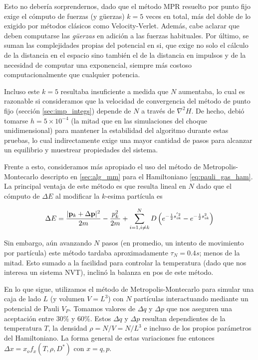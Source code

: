 Esto no debería sorprendernos, dado que el método MPR resuelto por punto fijo exige el cómputo de fuerzas (y güerzas) $k=5$ veces en total, más del doble de lo exigido por métodos clásicos como Velocity-Verlet.
Además, cabe aclarar que deben computarse las \textit{güerzas} en adición a las fuerzas habituales.
Por último, se suman las complejidades propias del potencial en si, que exige no solo el cálculo de la distancia en el espacio sino también el de la distancia en impulsos y de la necesidad
de computar una exponencial, siempre más costoso computacionalmente que cualquier potencia.

Incluso este $k=5$ resultaba insuficiente a medida que $N$ aumentaba, lo cual es razonable si consideramos que la velocidad de convergencia del método de punto fijo (sección \ref{sec:imp_integs})
depende de $N$ a través de $\nabla^2H$.
De hecho, debió tomarse $h=5\times10^{-4}$ (la mitad que en las simulaciones del choque unidimensional) para mantener la estabilidad del algoritmo durante estas pruebas, 
lo cual indirectamente exige una mayor cantidad de pasos para alcanzar un equilibrio y muestrear propiedades del sistema.

Frente a esto, consideramos más apropiado el uso del método de Metropolis-Montecarlo descripto en \ref{sec:alg_mm} para el Hamiltoniano \eqref{eq:pauli_gas_ham}.
La principal ventaja de este método es que resulta lineal en $N$ dado que el cómputo de $\Delta E$ al modificar la $k$-esima partícula es

\begin{equation}{\label{eq:delta_E}}
 \Delta E =  \frac{|\mathbf{p}_k + \Delta \mathbf{p}|^2}{2m} - \frac{p_k^2}{2m} + \sum_{i=1, i\neq k}^N D\left( e^{-\frac{1}{2}s_{ik}^{'2}}-e^{-\frac{1}{2}s_{ik}^2}  \right)
\end{equation}

Sin embargo, aún avanzando $N$ pasos (en promedio, un intento de movimiento por partícula) este método tardaba aproximadamente $\tau_N = 0.4s$; menos de la mitad.
Esto sumado a la facilidad para controlar la temperatura (dado que nos interesa un sistema NVT), inclinó la balanza en pos de este método.

En lo que sigue, utilizamos el método de Metropolis-Montecarlo para simular una caja de lado $L$ (y volumen $V=L^3$) con $N$ partículas interactuando mediante un potencial de Pauli $V_P$.
Tomamos valores de $\Delta q$ y $\Delta p$ que nos aseguren una aceptación entre $30\%$ y $60\%$.
Estos $\Delta q$ y $\Delta p$ resultan dependientes de la temperatura $T$, la densidad $\rho = N/V = N/L^3$ e incluso de los propios parámetros del Hamiltoniano.
La forma general de estas variaciones fue entonces $\Delta x = x_o f_x(T, \rho, D^*)$  con $x=q,p$.

